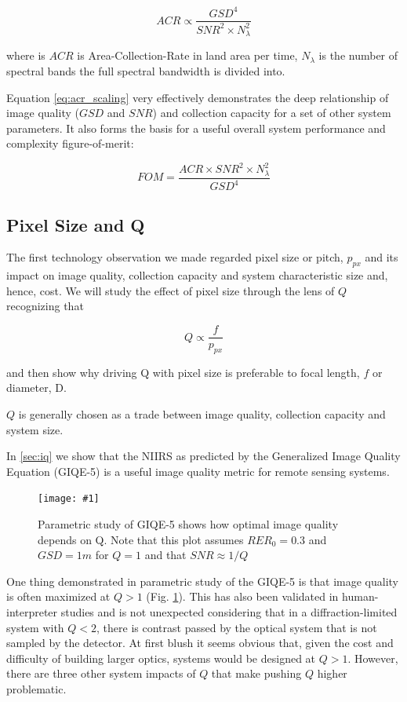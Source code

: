 \documentclass[10pt,journal]{IEEEtran}  %
\newcommand{\includefigure}[3]
{
  \begin{figure}[h!]
  \centering
  \texttt{[image: \#1]}
  \caption[]{#3}
  \label{#2}
  \end{figure}
}
\begin{document}
\begin{equation}
    \label{eq:acr_scaling}
    ACR \propto \frac{GSD^4}{SNR^2 \times N_{\lambda}^2}
\end{equation}

where is $ACR$ is Area-Collection-Rate in land area per time, $N_{\lambda}$ is the number of spectral bands the full spectral bandwidth is divided into.  

Equation \ref{eq:acr_scaling} very effectively demonstrates the deep relationship of image quality ($GSD$ and $SNR$) and collection capacity for a set of other system parameters.  It also forms the basis for a useful overall system performance and complexity figure-of-merit:

\begin{equation}
    \label{eq:perf_complex_metric}
    FOM = \frac{ACR \times SNR^2 \times N_{\lambda}^2}{GSD^4}
\end{equation}

\subsection{Pixel Size and Q}

The first technology observation we made regarded pixel size or pitch, $p_{px}$ and its impact on image quality, collection capacity and system characteristic size and, hence, cost.  We will study the effect of pixel size through the lens of $Q$ recognizing that

$$Q \propto \frac{f}{p_{px}}$$

and then show why driving Q with pixel size is preferable to focal length, $f$ or diameter, D.

$Q$ is generally chosen as a trade between image quality, collection capacity and system size.  

In \ref{sec:iq} we show that the NIIRS as predicted by the Generalized Image Quality Equation (GIQE-5) is a useful image quality metric for remote sensing systems.

\includefigure{figures/Q_iq.pgf}{fig:q_iq}{Parametric study of GIQE-5 shows how optimal image quality depends on Q.  Note that this plot assumes $RER_0 = 0.3$ and $GSD = 1m$ for $Q=1$ and that $SNR \approx 1 / Q$}

One thing demonstrated in parametric study of the GIQE-5 is that image quality is often maximized at $Q>1$ (Fig. \ref{fig:q_iq}).  This has also been validated in human-interpreter studies \cite{fiete_Q_IQ} and is not unexpected considering that in a diffraction-limited system with $Q<2$, there is contrast passed by the optical system that is not sampled by the detector.  At first blush it seems obvious that, given the cost and difficulty of building larger optics, systems would be designed at $Q>1$.  However, there are three other system impacts of $Q$ that make pushing $Q$ higher problematic.
\end{document}
